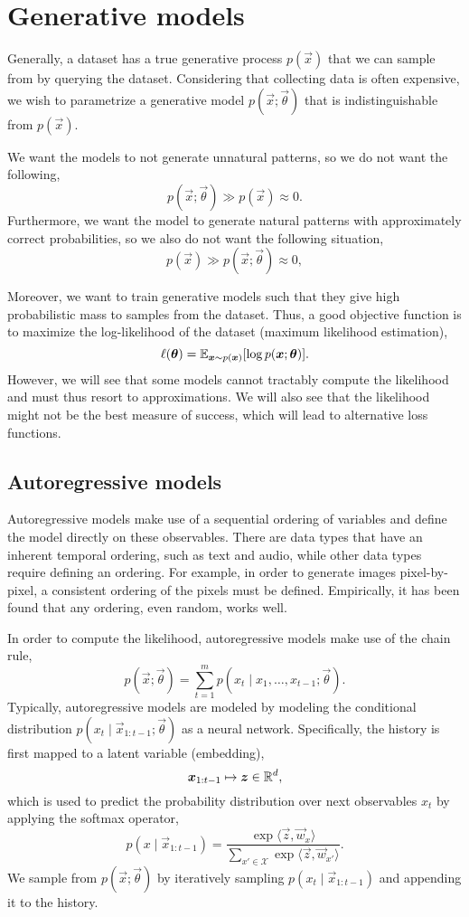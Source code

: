 \section{Generative models}

Generally, a dataset has a true generative process $p(\vec{x})$ that we can sample from by querying
the dataset. Considering that collecting data is often expensive, we wish to parametrize a
generative model $p(\vec{x}; \vec{\theta})$ that is indistinguishable from $p(\vec{x})$.

We want the models to not generate unnatural patterns, so we do not want the following, \[
    p(\vec{x}; \vec{\theta}) \gg p(\vec{x}) \approx 0.
\]
Furthermore, we want the model to generate natural patterns with approximately correct
probabilities, so we also do not want the following situation, \[
    p(\vec{x}) \gg p(\vec{x}; \vec{\theta}) \approx 0,
\]

Moreover, we want to train generative models such that they give high probabilistic mass to samples
from the dataset. Thus, a good objective function is to maximize the log-likelihood of the dataset
(maximum likelihood estimation), \[
    \ell(\bm{\theta}) = \mathbb{E}_{\bm{x} \sim p(\bm{x})}[\log p(\bm{x}; \bm{\theta})].
\]
However, we will see that some models cannot tractably compute the likelihood and must thus resort
to approximations. We will also see that the likelihood might not be the best measure of success,
which will lead to alternative loss functions.

\subsection{Autoregressive models}

Autoregressive models make use of a sequential ordering of variables and define the model directly
on these observables. There are data types that have an inherent temporal ordering, such as text
and audio, while other data types require defining an ordering. For example, in order to generate
images pixel-by-pixel, a consistent ordering of the pixels must be defined. Empirically, it has
been found that any ordering, even random, works well.

In order to compute the likelihood, autoregressive models make use of the chain rule, \[
    p(\vec{x}; \vec{\theta}) = \sum_{t=1}^{m} p(x_t \mid x_1, \ldots, x_{t-1}; \vec{\theta}).
\]
Typically, autoregressive models are modeled by modeling the conditional distribution $p(x_t \mid
    \vec{x}_{1:t-1}; \vec{\theta})$ as a neural network. Specifically, the history is first mapped to a
latent variable (embedding), \[
    \bm{x}_{1:t-1} \mapsto \bm{z} \in \mathbb{R}^d,
\]
which is used to predict the probability distribution over next observables $x_t$ by applying the
softmax operator, \[
    p(x \mid \vec{x}_{1:t-1}) = \frac{\exp \langle \vec{z}, \vec{w}_x \rangle}{\sum_{x' \in \mathcal{X}} \exp \langle \vec{z}, \vec{w}_{x'} \rangle}.
\]
We sample from $p(\vec{x}; \vec{\theta})$ by iteratively sampling $p(x_t \mid \vec{x}_{1:t-1})$ and
appending it to the history.

